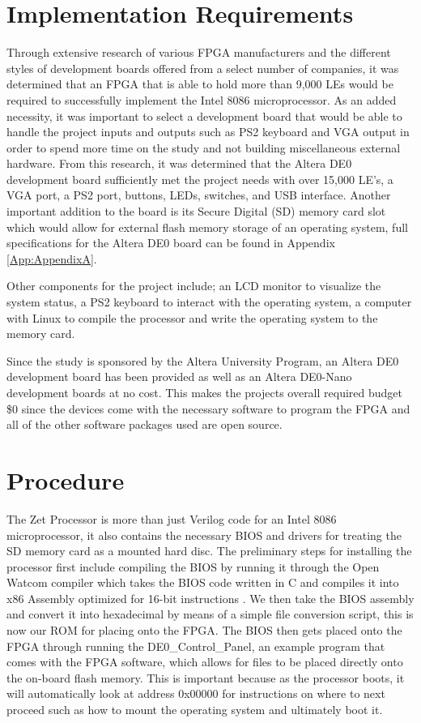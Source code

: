 \documentclass[pdftex,10.5pt]{report}
\begin{document}
\section{Implementation Requirements}
Through extensive research of various FPGA manufacturers and the different styles of development boards offered from a select number of companies, it was determined that an FPGA that is able to hold more than 9,000 LEs would be required to successfully implement the Intel 8086 microprocessor. As an added necessity, it was important to select a development board that would be able to handle the project inputs and outputs such as PS2 keyboard and VGA output in order to spend more time on the study and not building miscellaneous external hardware. From this research, it was determined that the Altera DE0 development board sufficiently met the project needs with over 15,000 LE's, a VGA port, a PS2 port, buttons, LEDs, switches, and USB interface. Another important addition to the board is its Secure Digital (SD) memory card slot which would allow for external flash memory storage of an operating system, full specifications for the Altera DE0 board can be found in Appendix \ref{App:AppendixA}.

Other components for the project include; an LCD monitor to visualize the system status, a PS2 keyboard to interact with the operating system, a computer with Linux to compile the processor and write the operating system to the memory card.

Since the study is sponsored by the Altera University Program, an Altera DE0 development board has been provided as well as an Altera DE0-Nano development boards at no cost. This makes the projects overall required budget \$0 since the devices come with the necessary software to program the FPGA and all of the other software packages used are open source.

\section{Procedure}
The Zet Processor is more than just Verilog code for an Intel 8086 microprocessor, it also contains the necessary BIOS and drivers for treating the SD memory card as a mounted hard disc. The preliminary steps for installing the processor first include compiling the BIOS by running it through the Open Watcom compiler which takes the BIOS code written in C and compiles it into x86 Assembly optimized for 16-bit instructions \cite{Watcom}. We then take the BIOS assembly and convert it into hexadecimal by means of a simple file conversion script, this is now our ROM for placing onto the FPGA. The BIOS then gets placed onto the FPGA through running the DE0\_Control\_Panel, an example program that comes with the FPGA software, which allows for files to be placed directly onto the on-board flash memory. This is important because as the processor boots, it will automatically look at address 0x00000 for instructions on where to next proceed such as how to mount the operating system and ultimately boot it. 
\end{document}
